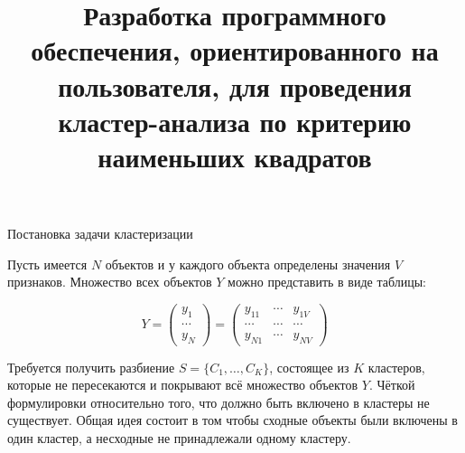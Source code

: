 \documentclass[aspectratio=169]{beamer}
\title{Разработка программного обеспечения, ориентированного на пользователя, для проведения кластер-анализа по критерию наименьших квадратов}
\author[Еремейкин П.А. \& Миркин Б.Г.]{
	\texorpdfstring{
	\begin{columns}
		\column{.45\linewidth}
		\raggedleft
		\begin{flushleft}
			Выполнил:\\
			Еремейкин Пётр Александрович\\
			студент группы мНоД16-ТМСС\\
			\href{mailto:eremeykin@gmail.com}{\texttt{eremeykin@gmail.com}}
		\end{flushleft}
		\column{.45\linewidth}
		\begin{flushright}
			Руководитель:\\
			Миркин Борис Григорьевич\\
			д.т.н., профессор\\
			\vspace*{1\baselineskip} 
		\end{flushright}
	\end{columns}
	}
	{Еремейкин \& Миркин}
}
\institute{\vspace{1cm} НИУ ВШЭ\\Июнь 2018}
\date{}
\begin{document}
	\begin{frame}
		\titlepage
	\end{frame}
	
	\begin{frame}{Постановка задачи кластеризации}
		\parbox{\linewidth}{
				Пусть имеется $ N $ объектов и у каждого объекта определены значения $ V $ признаков. Множество всех объектов $ Y $ можно представить в виде таблицы:
			}
		\begin{equation*}
			Y= \begin{pmatrix} 
			y_{1} \\
			\cdots \\ 
			y_{N} 
			\end{pmatrix}
			= \begin{pmatrix} 
			y_{11} & \cdots  & y_{1V} \\ 
			\cdots & \cdots  & \cdots \\ 
			y_{N1} & \cdots  & y_{NV} 
			\end{pmatrix}
		\end{equation*}
		\parbox{\linewidth}{
			Требуется получить разбиение $ S = \{C_1,\ldots,C_K\} $, состоящее из $ K $ кластеров, которые не пересекаются и 	покрывают всё множество объектов $ Y $. Чёткой формулировки относительно того, что должно быть включено в кластеры не существует.  Общая идея состоит в том чтобы сходные объекты были включены в один кластер, а несходные не принадлежали одному кластеру.
		}

		
	\end{frame}
	
\end{document}
